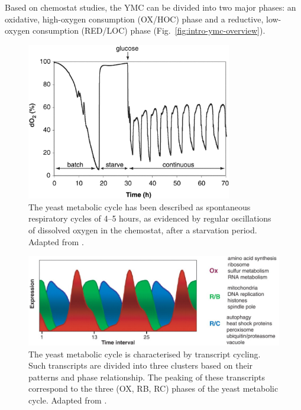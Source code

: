 Based on chemostat studies,
the YMC can be divided into two major phases: an oxidative, high-oxygen consumption (OX/HOC) phase and a reductive, low-oxygen consumption (RED/LOC) phase (Fig.\ \ref{fig:intro-ymc-overview}).

\begin{figure}
  \centering
  \includegraphics[width=0.8\textwidth]{tuLogicYeastMetabolic2005_1}
  \caption[
    The yeast metabolic cycle has been described as spontaneous respiratory cycles
  ]{
    The yeast metabolic cycle has been described as spontaneous respiratory cycles of 4--5 hours, as evidenced by regular oscillations of dissolved oxygen in the chemostat, after a starvation period.
    Adapted from \textcite{tuLogicYeastMetabolic2005}.}
  \label{fig:intro-ymc-tu-oxygen}
\end{figure}

\begin{figure}
  \centering
  \includegraphics[width=1.0\textwidth]{tuLogicYeastMetabolic2005_3d_adapted}
  \caption[
    The yeast metabolic cycle is characterised by transcript cycling
  ]{
    The yeast metabolic cycle is characterised by transcript cycling.
    Such transcripts are divided into three clusters based on their patterns and phase relationship.
    The peaking of these transcripts correspond to the three (OX, RB, RC) phases of the yeast metabolic cycle.
    Adapted from \textcite{tuLogicYeastMetabolic2005}.}
  \label{fig:intro-ymc-tu-transcripts}
\end{figure}

